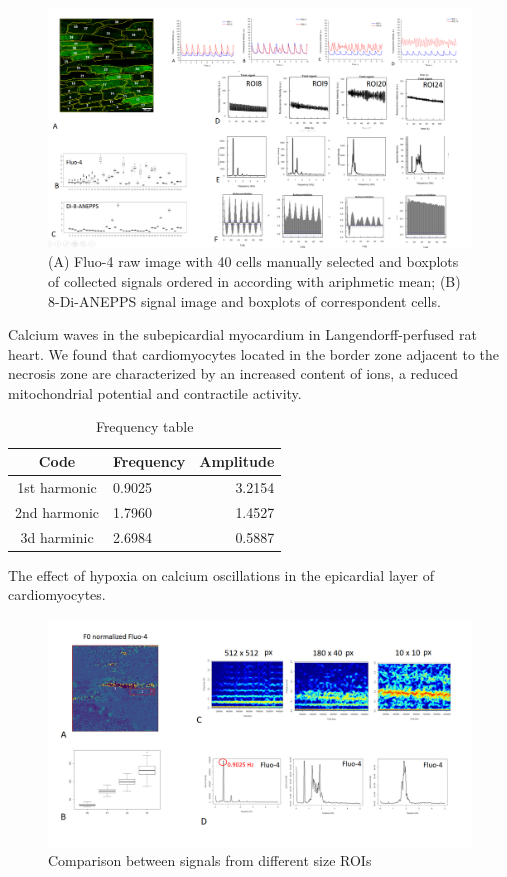 \documentclass{biophys-new}
\begin{document}
\begin{figure}
    \includegraphics[width=0.9\linewidth]{fig3.png}
    \caption{(A) Fluo-4 raw image with 40 cells manually selected and  boxplots of collected signals ordered in according with ariphmetic mean; (B) 8-Di-ANEPPS signal image and boxplots of correspondent cells. }
    \label{fig:fig3}
\end{figure}

Calcium waves in the subepicardial myocardium in Langendorff-perfused rat heart.
We found that cardiomyocytes located in the border zone adjacent to the necrosis zone are characterized by an increased content of  ions, a reduced mitochondrial potential and contractile activity.


\begin{table}[hbt!]
\caption{Frequency table}
\label{tab:freq}
\centering
\begin{threeparttable}
\begin{tabular}{c l r}
\hline
Code & Frequency & Amplitude  \\\hline
1st harmonic & 0.9025 & 3.2154 \\
2nd harmonic & 1.7960 & 1.4527  \\
3d harminic & 2.6984 & 0.5887    \\
\hline
\end{tabular}
\begin{tablenotes}
\end{tablenotes}
\end{threeparttable}
\end{table}


The effect of hypoxia on calcium oscillations in the epicardial layer of cardiomyocytes.
\begin{figure}
    \includegraphics[width=0.9\linewidth]{fig4.png}
    \caption{Comparison between signals from different size ROIs}
    \label{fig:fig4}
\end{figure}
\end{document}
